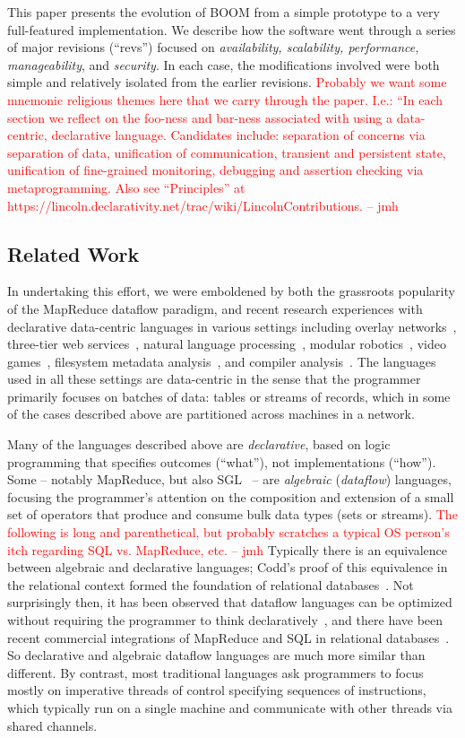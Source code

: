 \documentclass{sig-alternate}
\newcommand{\jmh}[1]{{\textcolor{red}{#1 -- jmh}}}
\begin{document}
This paper presents the evolution of BOOM from a simple prototype to a very full-featured implementation.  We describe how the software went through a series of major revisions (``revs'') focused on {\em availability, scalability, performance, manageability}, and {\em security}.  In each case, the modifications involved were both simple and relatively isolated from the earlier revisions.  \jmh{Probably we want some mnemonic religious themes here that we carry through the paper. I.e.: ``In each section we reflect on the foo-ness and bar-ness associated with using a data-centric, declarative language.  Candidates include: separation of concerns via separation of data, unification of communication, transient and persistent state, unification of fine-grained monitoring, debugging and assertion checking via metaprogramming.  Also see ``Principles'' at https://lincoln.declarativity.net/trac/wiki/LincolnContributions.}


\subsection{Related Work}
\label{sec:relwork}
In undertaking this effort, we were emboldened by both the grassroots popularity of the MapReduce dataflow paradigm, and recent research experiences with declarative data-centric languages in various settings including overlay networks~\cite{p2}, three-tier web services~\cite{hilda}, natural language processing~\cite{dyna}, modular robotics~\cite{meld}, video games~\cite{cornellgames}, filesystem metadata analysis~\cite{wiscfsck}, and compiler analysis~\cite{bddbddb}.  The languages used in all these settings are data-centric in the sense that the programmer primarily focuses on batches of data: tables or streams of records, which in some of the cases described above are partitioned across machines in a network.  

Many of the languages described above are {\em declarative}, based on logic programming that specifies outcomes (``what''), not implementations (``how'').  Some -- notably MapReduce, but also SGL~\cite{cornellgames} -- are {\em algebraic} ({\em dataflow}) languages, focusing the programmer's attention on the composition and extension of a small set of operators that produce and consume bulk data types (sets or streams).  \jmh{The following is long and parenthetical, but probably scratches a typical OS person's itch regarding SQL vs. MapReduce, etc.}  Typically there is an equivalence between algebraic and declarative languages; Codd's proof of this equivalence in the relational context formed the foundation of relational databases~\cite{Codd70}. Not surprisingly then, it has been observed that dataflow languages can be optimized without requiring the programmer to think declaratively~\cite{volcano,cornellgames}, and there have been recent commercial integrations of MapReduce and SQL in relational databases~\cite{greenplum,aster}.  So declarative and algebraic dataflow languages are much more similar than different. By contrast, most traditional languages ask programmers to focus mostly on imperative threads of control specifying sequences of instructions, which typically run on a single machine and communicate with other threads via shared channels.
\end{document}
